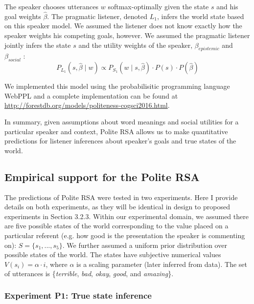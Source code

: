 The speaker chooses utterances $w$ softmax-optimally given the state $s$ and his goal weights $\hat{\beta}$. The pragmatic listener, denoted $L_1$, infers the world state based on this speaker model. We assumed the listener does not know exactly how the speaker weights his competing goals, however.
We assumed the pragmatic listener jointly infers the state $s$ and the utility weights of the speaker, $\beta_{epistemic}$ and $\beta_{social}$ \citep{GoodmanLassiter2015, Kao2014}:
\begin{equation}
P_{L_1}(s,  \hat{\beta} \mid w)\propto P_{S_1}(w \mid s,  \hat{\beta})\cdot P(s) \cdot P( \hat{\beta}) \label{eq:L1}
\end{equation}

We implemented this model using the probabilisitic programming language WebPPL \cite{dippl} and a complete implementation can be found at \url{http://forestdb.org/models/politeness-cogsci2016.html}.

In summary, given assumptions about word meanings and social utilities for a particular speaker and context, Polite RSA allows us to make quantitative predictions for listener inferences about speaker's goals and true states of the world.

\subsection{Empirical support for the Polite RSA}

The predictions of Polite RSA were tested in two experiments. Here I provide details on both experiments, as they will be identical in design to proposed experiments in Section 3.2.3. 
Within our experimental domain, we assumed there are five possible states of the world corresponding to the value placed on a particular referent (e.g. how good is the presentation the speaker is commenting on): $S = \{s_{1}, ...,  s_{5}\}$.
We further assumed a uniform prior distribution over possible states of the world.
The states have subjective numerical values $V(s_{i}) = \alpha \cdot i$, where $\alpha$ is a scaling parameter (later inferred from data).
The set of utterances is \{\emph{terrible}, \emph{bad}, \emph{okay}, \emph{good}, and \emph{amazing}\}.

\subsubsection{Experiment P1: True state inference}

